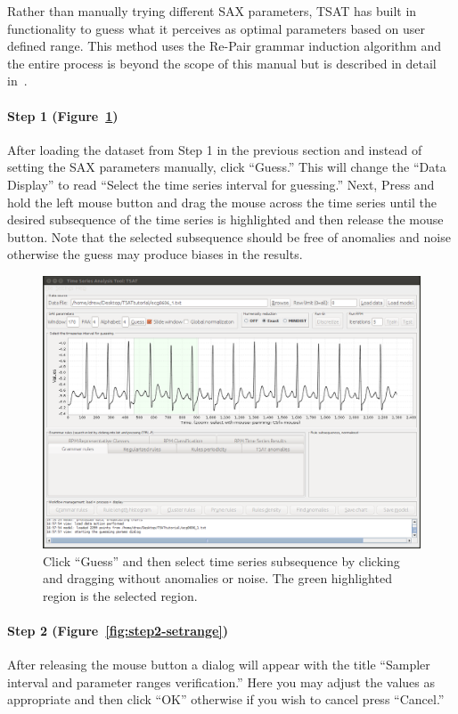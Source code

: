 \documentclass[letterpaper, 12pt]{article}
\begin{document}
Rather than manually trying different SAX parameters, TSAT has built in functionality to guess what it perceives as optimal parameters based on user defined range.  This method uses the Re-Pair grammar induction algorithm and the entire process is beyond the scope of this manual but is described in detail in~\cite{paramSelection}.

\paragraph{Step 1 (Figure~\ref{fig:step1-guess})} After loading the dataset from Step 1 in the previous section and instead of setting the SAX parameters manually, click ``Guess.''  This will change the ``Data Display'' to read ``Select the time series interval for guessing.'' Next, Press and hold the left mouse button and drag the mouse across the time series until the desired subsequence of the time series is highlighted and then release the mouse button.  Note that the selected subsequence should be free of anomalies and noise otherwise the guess may produce biases in the results.

\begin{figure}[H]
	\centering
	\includegraphics[width=\textwidth]{pictures/motifguide/step1-guess}
	\caption{Click ``Guess'' and then select time series subsequence by clicking and dragging without anomalies or noise.  The green highlighted region is the selected region. }
	\label{fig:step1-guess}
\end{figure}


\paragraph{Step 2 (Figure~\ref{fig:step2-setrange})} After releasing the mouse button a dialog will appear with the title ``Sampler interval and parameter ranges verification.''  Here you may adjust the values as appropriate and then click ``OK'' otherwise if you wish to cancel press ``Cancel.''  
\end{document}
